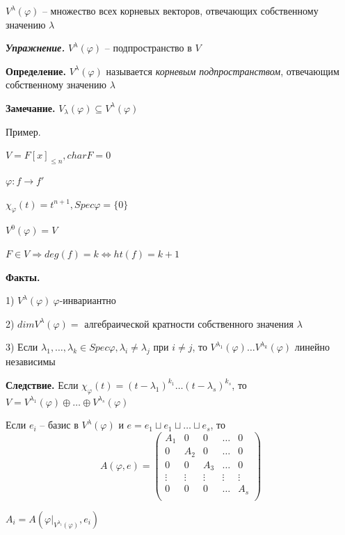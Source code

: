 \bigskip
$V^{\lambda} (\varphi)$ -- множество всех корневых векторов, отвечающих собственному значению $\lambda$

\bigskip
\textbf{\textit{Упражнение.}} $V^{\lambda} (\varphi)$ -- подпространство в $V$

\bigskip
\textbf{Определение.} $V^{\lambda} (\varphi)$ называется \textit{корневым подпространством}, отвечающим собственному значению $\lambda$

\bigskip
\textbf{Замечание.} $V_{\lambda} (\varphi) \subseteq V^{\lambda} (\varphi)$

\bigskip
Пример.

$V = F[x]_{\leqslant n}, char F = 0$

$\varphi: f \rightarrow f'$

$\chi_{\varphi}(t) = t^{n+1}, Spec \varphi = \{0\}$

$V^0 (\varphi) = V$

$F \in V \Rightarrow deg(f) = k \Leftrightarrow ht(f) = k + 1$

\bigskip
\textbf{Факты.}

1) $V^{\lambda} (\varphi) \ \varphi$-инвариантно

2) $dim V^{\lambda} (\varphi) = $ алгебраической кратности собственного значения $\lambda$

3) Если $\lambda_1, \dots, \lambda_k \in Spec \varphi, \lambda_i \neq \lambda_j$ при $i \neq j$, то $V^{\lambda_1} (\varphi) \dots V^{\lambda_k} (\varphi)$ линейно независимы

\bigskip
\textbf{Следствие.} Если $\chi_{\varphi} (t) = (t - \lambda_1)^{k_1} \dots (t - \lambda_s)^{k_s}$, то $V = V^{\lambda_1} (\varphi) \oplus \dots \oplus V^{\lambda_s} (\varphi)$

\bigskip
Если $e_i$ -- базис в $V^{\lambda} (\varphi)$ и $e = e_1 \sqcup e_1 \sqcup \dots \sqcup e_s$, то \begin{equation*}A(\varphi, e) = \left(
\begin{array}{c|c|c|c|c}
  A_1 & 0 & 0 & \dots & 0  \\
  \hline
  0 & A_2 & 0 & \dots & 0  \\
  \hline
  0 & 0 & A_3 & \dots & 0 \\
  \hline
  \vdots & \vdots & \vdots & \vdots & \vdots \\
  \hline
  0 & 0 & 0 & \dots & A_s \\
\end{array}
\right)\end{equation*}

$A_i = A(\varphi|_{V^{\lambda_i} (\varphi)}, e_i)$


